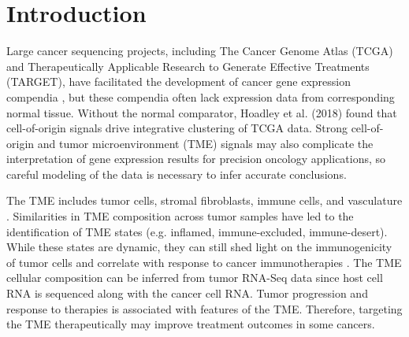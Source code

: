 \documentclass[10pt,letterpaper]{article}
\begin{document}
\section*{Introduction}
Large cancer sequencing projects, including The Cancer Genome Atlas (TCGA) and Therapeutically Applicable Research to Generate Effective Treatments (TARGET), have facilitated the development of cancer gene expression compendia \cite{vivianToilEnablesReproducible2017, pughGeneticLandscapeHighrisk2013, goldmanUCSCXenaPlatform2018, thecancergenomeatlasresearchnetworkCancerGenomeAtlas2013, newtonTumorMapExploringMolecular2017, vaskeComparativeTumorRNA2019}, but these compendia often lack expression data from corresponding normal tissue. Without the normal comparator, Hoadley et al. (2018) found that cell-of-origin signals drive integrative clustering of TCGA data. Strong cell-of-origin and tumor microenvironment (TME) signals may also complicate the interpretation of gene expression results for precision oncology applications, so careful modeling of the data is necessary to infer accurate conclusions.

The TME includes tumor cells, stromal fibroblasts, immune cells, and vasculature \cite{joyceCellExclusionImmune2015}. Similarities in TME composition across tumor samples have led to the identification of TME states (e.g. inflamed, immune-excluded, immune-desert). While these states are dynamic, they can still shed light on the immunogenicity of tumor cells and correlate with response to cancer immunotherapies \cite{chenElementsCancerImmunity2017}. The TME cellular composition can be inferred from tumor RNA-Seq data since host cell RNA is sequenced along with the cancer cell RNA. Tumor progression and response to therapies is associated with features of the TME. Therefore, targeting the TME therapeutically may improve treatment outcomes in some cancers.
\end{document}
